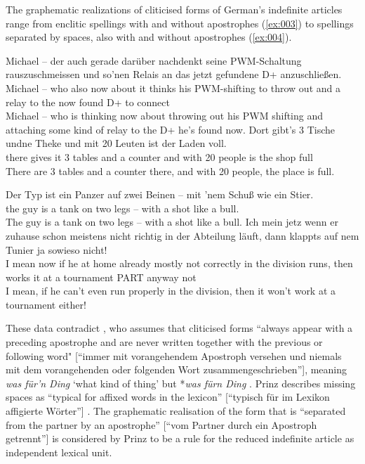 The graphematic realizations of cliticised forms of German's indefinite articles range from enclitic spellings with and without apostrophes (\ref{ex:003}) to spellings separated by spaces, also with and without apostrophes (\ref{ex:004}).

\begin{exe}
	\ex\label{ex:003}
	\begin{xlist}
		\ex\label{ex:0006}\gll Michael -- der auch gerade darüber nachdenkt seine PWM-Schaltung rauszuschmeissen und so'nen Relais an das jetzt gefundene D+ anzuschließen.\\
		Michael -- who also now {about it} thinks his PWM-shifting {to throw out} and a relay to the now found D+ {to connect}\\
		\trans Michael -- who is thinking now about throwing out his PWM shifting and attaching some kind of relay to the D+ he's found now.
		\ex\label{ex:0007}\gll Dort gibt's 3 Tische undne Theke und mit 20 Leuten ist der Laden voll.\\
		there {gives it} 3 tables {and a} counter and with 20 people is the shop full\\
		\trans There are 3 tables and a counter there, and with 20 people, the place is full.
	\end{xlist}
	\ex\label{ex:004}
	\begin{xlist}
		\ex\label{ex:0008}\gll Der Typ ist ein Panzer auf zwei Beinen -- mit 'nem Schuß wie ein Stier.\\
		the guy is a tank on two legs -- with a shot like a bull.\\
		\trans The guy is a tank on two legs -- with a shot like a bull.
		\ex\label{ex:0009}\gll Ich mein jetz wenn er zuhause schon meistens nicht richtig in der Abteilung läuft, dann klappts auf nem Tunier ja sowieso nicht!\\
		I mean now if he {at home} already mostly not correctly in the division runs, then {works it} at a tournament PART anyway not\\
		\trans I mean, if he can't even run properly in the division, then it won't work at a tournament either!
	\end{xlist}
\end{exe}

These data contradict \citet{Prinz1991}, who assumes that cliticised forms ``always appear with a preceding apostrophe and are never written together with the previous or following word" [``immer mit vorangehendem Apostroph versehen und niemals mit dem vorangehenden oder folgenden Wort zusammengeschrieben''], meaning \textit{was für'n Ding} `what kind of thing' but *\textit{was fürn Ding} \citep[114]{Prinz1991}.
Prinz describes missing spaces as ``typical for affixed words in the lexicon'' [``typisch für im Lexikon affigierte Wörter''] \citep[101]{Prinz1991}.
The graphematic realisation of the form that is ``separated from the partner by an apostrophe'' [``vom Partner durch ein Apostroph getrennt''] is considered by Prinz to be a rule for the reduced indefinite article as independent lexical unit.

